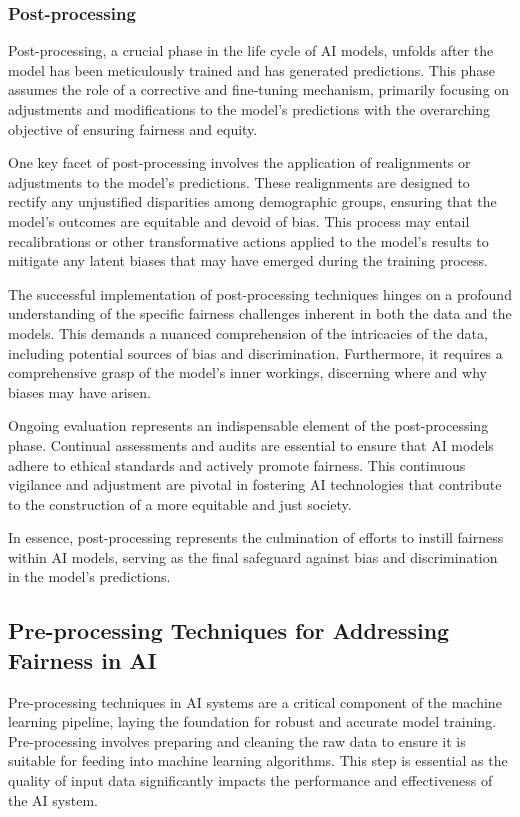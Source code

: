 \documentclass[12pt,a4paper,openright,twoside]{book}
\begin{document}
\subsubsection{Post-processing}

Post-processing, a crucial phase in the life cycle of AI models, unfolds after the model has been meticulously trained and has generated predictions. This phase assumes the role of a corrective and fine-tuning mechanism, primarily focusing on adjustments and modifications to the model's predictions with the overarching objective of ensuring fairness and equity. 

One key facet of post-processing involves the application of realignments or adjustments to the model's predictions. These realignments are designed to rectify any unjustified disparities among demographic groups, ensuring that the model's outcomes are equitable and devoid of bias. This process may entail recalibrations or other transformative actions applied to the model's results to mitigate any latent biases that may have emerged during the training process. 

The successful implementation of post-processing techniques hinges on a profound understanding of the specific fairness challenges inherent in both the data and the models. This demands a nuanced comprehension of the intricacies of the data, including potential sources of bias and discrimination. Furthermore, it requires a comprehensive grasp of the model's inner workings, discerning where and why biases may have arisen. 

Ongoing evaluation represents an indispensable element of the post-processing phase. Continual assessments and audits are essential to ensure that AI models adhere to ethical standards and actively promote fairness. This continuous vigilance and adjustment are pivotal in fostering AI technologies that contribute to the construction of a more equitable and just society. 

In essence, post-processing represents the culmination of efforts to instill fairness within AI models, serving as the final safeguard against bias and discrimination in the model's predictions.

\subsection{Pre-processing Techniques for Addressing Fairness in AI}

Pre-processing techniques in AI systems are a critical component of the machine learning pipeline, laying the foundation for robust and accurate model training. Pre-processing involves preparing and cleaning the raw data to ensure it is suitable for feeding into machine learning algorithms. This step is essential as the quality of input data significantly impacts the performance and effectiveness of the AI system. 
\end{document}
